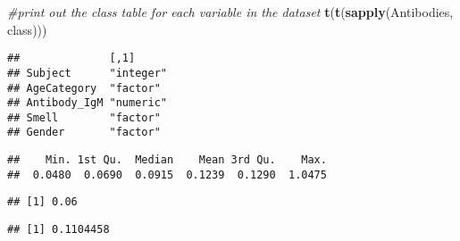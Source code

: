 \documentclass[]{article}
\newenvironment{Shaded}{\begin{snugshade}}{\end{snugshade}}
\newcommand{\CommentTok}[1]{\textcolor[rgb]{0.56,0.35,0.01}{\textit{#1}}}
\newcommand{\KeywordTok}[1]{\textcolor[rgb]{0.13,0.29,0.53}{\textbf{#1}}}
\newcommand{\NormalTok}[1]{#1}
\newcommand{\OperatorTok}[1]{\textcolor[rgb]{0.81,0.36,0.00}{\textbf{#1}}}
\newcommand{\StringTok}[1]{\textcolor[rgb]{0.31,0.60,0.02}{#1}}
\begin{document}
\begin{Shaded}
\begin{Highlighting}[]
\CommentTok{#print out the class table for each variable in the dataset}
\KeywordTok{t}\NormalTok{(}\KeywordTok{t}\NormalTok{(}\KeywordTok{sapply}\NormalTok{(Antibodies, class)))}
\end{Highlighting}
\end{Shaded}

\begin{verbatim}
##              [,1]     
## Subject      "integer"
## AgeCategory  "factor" 
## Antibody_IgM "numeric"
## Smell        "factor" 
## Gender       "factor"
\end{verbatim}

\begin{Shaded}
\end{Shaded}

\begin{verbatim}
##    Min. 1st Qu.  Median    Mean 3rd Qu.    Max. 
##  0.0480  0.0690  0.0915  0.1239  0.1290  1.0475
\end{verbatim}

\begin{Shaded}
\end{Shaded}

\begin{verbatim}
## [1] 0.06
\end{verbatim}

\begin{Shaded}
\end{Shaded}

\begin{verbatim}
## [1] 0.1104458
\end{verbatim}
\end{document}
